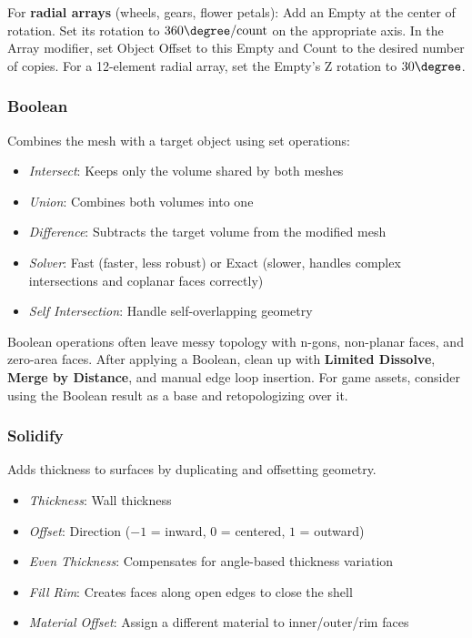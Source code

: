 \begin{tipbox}
For \textbf{radial arrays} (wheels, gears, flower petals): Add an Empty at the center of rotation. Set its rotation to $360\degree / \text{count}$ on the appropriate axis. In the Array modifier, set Object Offset to this Empty and Count to the desired number of copies. For a 12-element radial array, set the Empty's Z rotation to $30\degree$.
\end{tipbox}

\subsubsection{Boolean}
\label{sec:boolean}

Combines the mesh with a target object using set operations:

\begin{itemize}[leftmargin=2em]
  \item \textit{Intersect}: Keeps only the volume shared by both meshes
  \item \textit{Union}: Combines both volumes into one
  \item \textit{Difference}: Subtracts the target volume from the modified mesh
  \item \textit{Solver}: Fast (faster, less robust) or Exact (slower, handles complex intersections and coplanar faces correctly)
  \item \textit{Self Intersection}: Handle self-overlapping geometry
\end{itemize}

\begin{warningbox}
Boolean operations often leave messy topology with n-gons, non-planar faces, and zero-area faces. After applying a Boolean, clean up with \textbf{Limited Dissolve}, \textbf{Merge by Distance}, and manual edge loop insertion. For game assets, consider using the Boolean result as a base and retopologizing over it.
\end{warningbox}

\subsubsection{Solidify}

Adds thickness to surfaces by duplicating and offsetting geometry.

\begin{itemize}[leftmargin=2em]
  \item \textit{Thickness}: Wall thickness
  \item \textit{Offset}: Direction ($-1$ = inward, $0$ = centered, $1$ = outward)
  \item \textit{Even Thickness}: Compensates for angle-based thickness variation
  \item \textit{Fill Rim}: Creates faces along open edges to close the shell
  \item \textit{Material Offset}: Assign a different material to inner/outer/rim faces
\end{itemize}

